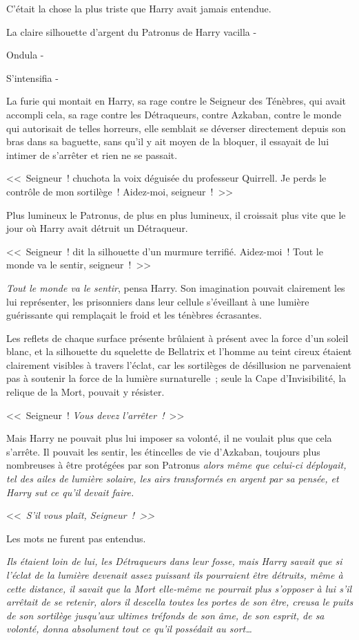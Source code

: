 C'était la chose la plus triste que Harry avait jamais entendue.

La claire silhouette d'argent du Patronus de Harry vacilla -

Ondula -

S'intensifia -

La furie qui montait en Harry, sa rage contre le Seigneur des Ténèbres, qui avait accompli cela, sa rage contre les Détraqueurs, contre Azkaban, contre le monde qui autorisait de telles horreurs, elle semblait se déverser directement depuis son bras dans sa baguette, sans qu'il y ait moyen de la bloquer, il essayait de lui intimer de s'arrêter et rien ne se passait.

<<~Seigneur~! chuchota la voix déguisée du professeur Quirrell. Je perds le contrôle de mon sortilège~! Aidez-moi, seigneur~!~>>

Plus lumineux le Patronus, de plus en plus lumineux, il croissait plus vite que le jour où Harry avait détruit un Détraqueur.

<<~Seigneur~! dit la silhouette d'un murmure terrifié. Aidez-moi~! Tout le monde va le sentir, seigneur~!~>>

\emph{Tout le monde va le sentir}, pensa Harry. Son imagination pouvait clairement les lui représenter, les prisonniers dans leur cellule s'éveillant à une lumière guérissante qui remplaçait le froid et les ténèbres écrasantes.

Les reflets de chaque surface présente brûlaient à présent avec la force d'un soleil blanc, et la silhouette du squelette de Bellatrix et l'homme au teint cireux étaient clairement visibles à travers l'éclat, car les sortilèges de désillusion ne parvenaient pas à soutenir la force de la lumière surnaturelle~; seule la Cape d'Invisibilité, la relique de la Mort, pouvait y résister.

<<~Seigneur~! \emph{Vous devez l'arrêter~!}~>>

Mais Harry ne pouvait plus lui imposer sa volonté, il ne voulait plus que cela s'arrête. Il pouvait les sentir, les étincelles de vie d'Azkaban, toujours plus nombreuses à être protégées par son Patronus \emph{alors même que celui-ci déployait, tel des ailes de lumière solaire, les airs transformés en argent par sa pensée, et Harry sut ce qu'il devait faire.}

<<~\emph{S'il vous plaît, Seigneur~!~>>}

Les mots ne furent pas entendus.

\emph{Ils étaient loin de lui, les Détraqueurs dans leur fosse, mais Harry savait que si l'éclat de la lumière devenait assez puissant ils pourraient être détruits, même à cette distance, il savait que la Mort elle-même ne pourrait plus s'opposer à lui s'il arrêtait de se retenir, alors il descella toutes les portes de son être, creusa le puits de son sortilège jusqu'aux ultimes tréfonds de son âme, de son esprit, de sa volonté, donna absolument tout ce qu'il possédait au sort…}


